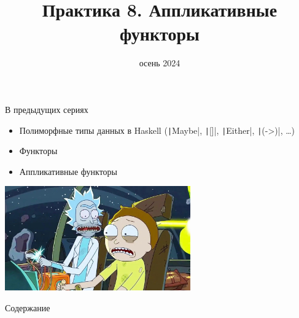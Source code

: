 
\newif\ifhandout




\title[8. Аппликативные функторы]{Практика 8. Аппликативные функторы}
\date{осень 2024}



    \setcounter{framenumber}{-1}
    \mymaketitle

    \begin{frame}[fragile]{В предыдущих сериях}
        \begin{itemize}
            \item Полиморфные типы данных в Haskell (\texttt|Maybe|, \texttt|[]|, \texttt|Either|, \texttt|(->)|, \ldots)
            \item Функторы
            \item[\newtopic] Аппликативные функторы
        \end{itemize}
        \begin{center}
            \includegraphics[width=0.6\textwidth]{figs/previous}
        \end{center}
    \end{frame}

    \begin{frame}[noframenumbering]{Содержание}
        \tableofcontents
    \end{frame}


